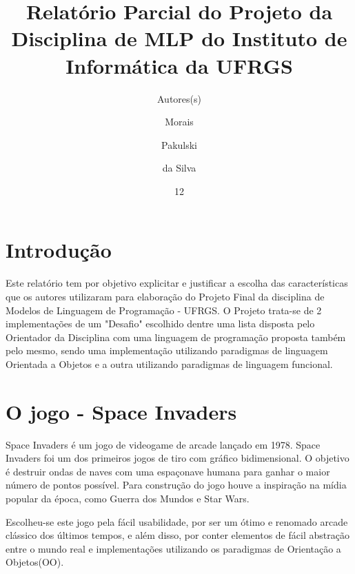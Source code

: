 \documentclass[rel_mlp]{iiufrgs}
\title{Relatório Parcial do Projeto da Disciplina de MLP do Instituto de Informática da UFRGS}
\author{Autores(s)}{Aluno(s)} %
\author{Morais}{Bruno} %
\author{Pakulski}{Gabriel}
\author{da Silva}{Marcos Vinicios}       %
\date{12}{2018}
\begin{document}
\maketitle      









%
\chapter{Introdução} \label{intro}

Este relatório tem por objetivo explicitar e justificar a escolha das características que os autores utilizaram para elaboração do Projeto Final da disciplina de Modelos de Linguagem de Programação - UFRGS. O Projeto trata-se de 2 implementações de um "Desafio" escolhido dentre uma lista disposta pelo Orientador da Disciplina com uma linguagem de programação proposta também pelo mesmo, sendo uma implementação utilizando paradigmas de linguagem Orientada a Objetos e a outra utilizando paradigmas de linguagem funcional.


%
\chapter{O jogo - Space Invaders}


Space Invaders é um jogo de videogame de arcade lançado em 1978. Space Invaders foi um dos primeiros jogos de tiro com gráfico bidimensional. O objetivo é destruir ondas de naves com uma espaçonave humana para ganhar o maior número de pontos possível. Para construção do jogo houve a inspiração na mídia popular da época, como Guerra dos Mundos e Star Wars.

Escolheu-se este jogo pela fácil usabilidade, por ser um ótimo e renomado arcade clássico dos últimos tempos, e além disso, por conter elementos de fácil abstração entre o mundo real e implementações utilizando os paradigmas de Orientação a Objetos(OO).
\end{document}
